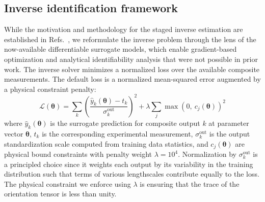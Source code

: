 \documentclass[preprint,review,10pt,number]{elsarticle}
\begin{document}
\subsection{Inverse identification framework}

While the motivation and methodology for the staged inverse estimation are established in Refs.~\cite{thomas2022machine, thomas2024probabilistic, ghosh2025framework}, we reformulate the inverse problem through the lens of the now-available differentiable surrogate models, which enable gradient-based optimization and analytical identifiability analysis that were not possible in prior work.
The inverse solver minimizes a normalized loss over the available composite measurements.
The default loss is a normalized mean-squared 
error augmented by a physical constraint penalty:
%
\begin{equation}
    \mathcal{L}(\boldsymbol{\theta}) = 
    \sum_{k} \left(\frac{\hat{y}_k(\boldsymbol{\theta}) - 
    t_k}{\sigma_k^{\text{out}}}\right)^{\!2} 
    + \lambda \sum_{j} \max\!\left(0,\ 
    c_j(\boldsymbol{\theta})\right)^2
    \label{eq:loss_default}
\end{equation}
%
where $\hat{y}_k(\boldsymbol{\theta})$ is the surrogate prediction for composite output $k$ at parameter vector $\boldsymbol{\theta}$, $t_k$ is the corresponding experimental measurement, $\sigma_k^{\text{out}}$ is the output standardization scale computed from training data statistics, and $c_j(\boldsymbol{\theta})$ are physical bound constraints with penalty weight $\lambda = 10^4$. 
Normalization by $\sigma_k^{\text{out}}$ is a principled choice since it weights each output by its variability in the training distribution such that terms of various lengthscales contribute equally to the loss.
The physical constraint we enforce using $\lambda$ is ensuring that the trace of the orientation tensor is less than unity.
\end{document}
